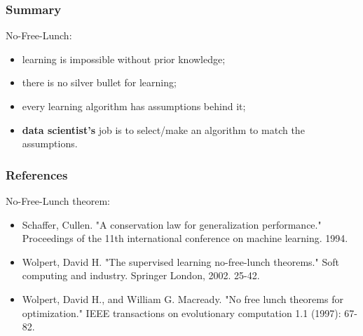 \documentclass[mathserif, aspectratio=43]{beamer}
\begin{document}
\begin{frame}[fragile]
\frametitle{Summary}
No-Free-Lunch:
\begin{itemize}
\item learning is impossible without prior knowledge;
\item there is no silver bullet for learning;
\item every learning algorithm has assumptions behind it;
\item \textbf{data scientist's} job is to select/make an algorithm to match the assumptions.
\end{itemize}

\end{frame}


\begin{frame}[fragile]
\frametitle{References}
No-Free-Lunch theorem:
\begin{itemize}
\item Schaffer, Cullen. "A conservation law for generalization performance." Proceedings of the 11th international conference on machine learning. 1994.
\item Wolpert, David H. "The supervised learning no-free-lunch theorems." Soft computing and industry. Springer London, 2002. 25-42.
\item Wolpert, David H., and William G. Macready. "No free lunch theorems for optimization." IEEE transactions on evolutionary computation 1.1 (1997): 67-82.
\end{itemize}

\end{frame}
\end{document}
